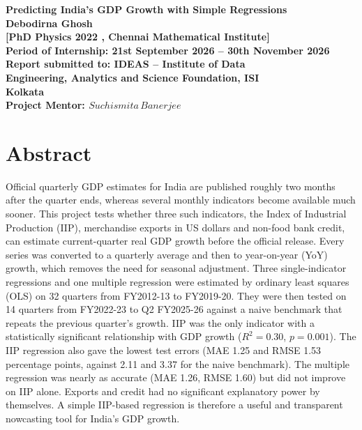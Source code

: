 \documentclass[11pt, a4paper]{article}
\begin{document}
\begin{titlepage}
    \centering
    \vspace*{1.5cm}
    
    
    {\LARGE \textbf{Predicting India's GDP Growth with Simple Regressions}} \\[2.2cm]
    
    {\Large \textbf{Debodirna Ghosh}} \\[0.3cm]
    {\large \textbf{[PhD Physics 2022 , Chennai Mathematical Institute]}} \\[2cm]
    
    {\large \textbf{Period of Internship: 21st September 2026 -- 30th November 2026}} \\[2.2cm]
    
    {\Large \textbf{Report submitted to: IDEAS -- Institute of Data}} \\[0.2cm]
    {\Large \textbf{Engineering, Analytics and Science Foundation, ISI}} \\[0.2cm]
    {\Large \textbf{Kolkata}} \\[2.5cm]
    
    {\large \textbf{Project Mentor: $Suchismita \, Banerjee$}}
    
    \vfill
\end{titlepage}

\section{Abstract}
Official quarterly GDP estimates for India are published roughly two months after the quarter ends, whereas several monthly indicators become available much sooner. This project tests whether three such indicators, the Index of Industrial Production (IIP), merchandise exports in US dollars and non-food bank credit, can estimate current-quarter real GDP growth before the official release. Every series was converted to a quarterly average and then to year-on-year (YoY) growth, which removes the need for seasonal adjustment. Three single-indicator regressions and one multiple regression were estimated by ordinary least squares (OLS) on 32 quarters from FY2012-13 to FY2019-20. They were then tested on 14 quarters from FY2022-23 to Q2 FY2025-26 against a naive benchmark that repeats the previous quarter's growth. IIP was the only indicator with a statistically significant relationship with GDP growth ($R^2 = 0.30$, $p = 0.001$). The IIP regression also gave the lowest test errors (MAE 1.25 and RMSE 1.53 percentage points, against 2.11 and 3.37 for the naive benchmark). The multiple regression was nearly as accurate (MAE 1.26, RMSE 1.60) but did not improve on IIP alone. Exports and credit had no significant explanatory power by themselves. A simple IIP-based regression is therefore a useful and transparent nowcasting tool for India's GDP growth.
\end{document}
